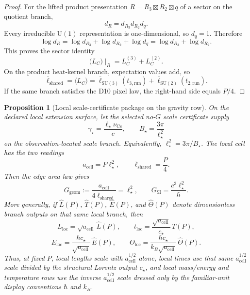 \documentclass[11pt]{article}
\newtheorem{proposition}[theorem]{Proposition}
\newcommand{\U}{\mathrm{U}}
\newcommand{\ellbar}{\bar{\ell}}
\begin{document}
\begin{proof}
For the lifted product presentation \(R=R_3\boxtimes R_2\boxtimes q\) of a sector on the quotient
branch,
\[
d_R=d_{R_3}d_{R_2}d_q.
\]
Every irreducible \( \U(1) \) representation is one-dimensional, so \(d_q=1\). Therefore
\[
\log d_R
=
\log d_{R_3}+\log d_{R_2}+\log d_q
=
\log d_{R_3}+\log d_{R_2}.
\]
This proves the sector identity
\[
\bigl(L_C\bigr)\!\mid_R=L_C^{(3)}+L_C^{(2)}.
\]
On the product heat-kernel branch, expectation values add, so
\[
\ellbar_{\mathrm{shared}}
=
\langle L_C\rangle
=
\ellbar_{\mathrm{SU(3)}}(t_{3,\mathrm{run}})
+
\ellbar_{\mathrm{SU(2)}}(t_{2,\mathrm{run}}).
\]
If the same branch satisfies the D10 pixel law, the right-hand side equals \(P/4\). \qedhere
\end{proof}

\begin{proposition}[Local scale-certificate package on the gravity row]\label{prop:gsi}
On the declared local extension surface, let the selected no-\(G\) scale certificate supply
\[
\gamma_\star=\frac{\ell_\star\nu_{\mathrm{Cs}}}{c},
\qquad
B_\star=\frac{3\pi}{\ell_\star^2}
\]
on the observation-located scale branch. Equivalently,
\(\ell_\star^2=3\pi/B_\star\). The local cell has the two readings
\[
a_{\mathrm{cell}}=P\ell_\star^2,
\qquad
\ellbar_{\mathrm{shared}}=\frac{P}{4}.
\]
Then the edge area law gives
\[
G_{\mathrm{geom}}
:=
\frac{a_{\mathrm{cell}}}{4\ellbar_{\mathrm{shared}}}
=
\ell_\star^2,
\qquad
G_{\mathrm{SI}}
=
\frac{c^3\ell_\star^2}{\hbar}.
\]
More generally, if \(\widehat L(P)\), \(\widehat T(P)\), \(\widehat E(P)\), and
\(\widehat\Theta(P)\) denote dimensionless branch outputs on that same local branch, then
\[
L_{\mathrm{loc}}=\sqrt{a_{\mathrm{cell}}}\,\widehat L(P),
\qquad
t_{\mathrm{loc}}=\frac{\sqrt{a_{\mathrm{cell}}}}{c_\star}\,\widehat T(P),
\]
\[
E_{\mathrm{loc}}=\frac{\hbar c_\star}{\sqrt{a_{\mathrm{cell}}}}\,\widehat E(P),
\qquad
\Theta_{\mathrm{loc}}=\frac{\hbar c_\star}{k_B\sqrt{a_{\mathrm{cell}}}}\,\widehat\Theta(P).
\]
Thus, at fixed \(P\), local lengths scale with \(a_{\mathrm{cell}}^{1/2}\) alone, local times
use that same \(a_{\mathrm{cell}}^{1/2}\) scale divided by the structural Lorentz output \(c_\star\),
and local mass/energy and temperature rows use the inverse \(a_{\mathrm{cell}}^{1/2}\) scale
dressed only by the familiar-unit display conventions \(\hbar\) and \(k_B\).
\end{proposition}
\end{document}
